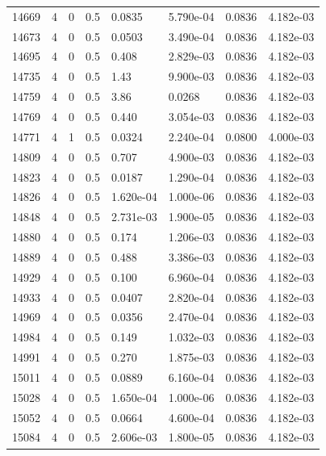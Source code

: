\documentclass[preview]{standalone}
\begin{document}
{{{{{{{{{{{{{{{{\begin{tabular}{L{1.2cm}C{1.2cm} C{0.3cm}C{0.5cm} C{1.4cm}C{1.4cm} C{1.4cm}C{1.4cm}}
  14669  &     4  & 0     & 0.5 &  0.0835  & 5.790e-04  & 0.0836 &  4.182e-03   \\ 
  14673  &     4  & 0     & 0.5 &  0.0503  & 3.490e-04  & 0.0836 &  4.182e-03   \\ 
  14695  &     4  & 0     & 0.5 &  0.408  & 2.829e-03  & 0.0836 &  4.182e-03   \\ 
  14735  &     4  & 0     & 0.5 &  1.43  & 9.900e-03  & 0.0836 &  4.182e-03   \\ 
  14759  &     4  & 0     & 0.5 &  3.86  & 0.0268  & 0.0836 &  4.182e-03   \\ 
  14769  &     4  & 0     & 0.5 &  0.440  & 3.054e-03  & 0.0836 &  4.182e-03   \\ 
  14771  &     4  & 1     & 0.5 &  0.0324  & 2.240e-04  & 0.0800 &  4.000e-03   \\ 
  14809  &     4  & 0     & 0.5 &  0.707  & 4.900e-03  & 0.0836 &  4.182e-03   \\ 
  14823  &     4  & 0     & 0.5 &  0.0187  & 1.290e-04  & 0.0836 &  4.182e-03   \\ 
  14826  &     4  & 0     & 0.5 &  1.620e-04  & 1.000e-06  & 0.0836 &  4.182e-03   \\ 
  14848  &     4  & 0     & 0.5 &  2.731e-03  & 1.900e-05  & 0.0836 &  4.182e-03   \\ 
  14880  &     4  & 0     & 0.5 &  0.174  & 1.206e-03  & 0.0836 &  4.182e-03   \\ 
  14889  &     4  & 0     & 0.5 &  0.488  & 3.386e-03  & 0.0836 &  4.182e-03   \\ 
  14929  &     4  & 0     & 0.5 &  0.100  & 6.960e-04  & 0.0836 &  4.182e-03   \\ 
  14933  &     4  & 0     & 0.5 &  0.0407  & 2.820e-04  & 0.0836 &  4.182e-03   \\ 
  14969  &     4  & 0     & 0.5 &  0.0356  & 2.470e-04  & 0.0836 &  4.182e-03   \\ 
  14984  &     4  & 0     & 0.5 &  0.149  & 1.032e-03  & 0.0836 &  4.182e-03   \\ 
  14991  &     4  & 0     & 0.5 &  0.270  & 1.875e-03  & 0.0836 &  4.182e-03   \\ 
  15011  &     4  & 0     & 0.5 &  0.0889  & 6.160e-04  & 0.0836 &  4.182e-03   \\ 
  15028  &     4  & 0     & 0.5 &  1.650e-04  & 1.000e-06  & 0.0836 &  4.182e-03   \\ 
  15052  &     4  & 0     & 0.5 &  0.0664  & 4.600e-04  & 0.0836 &  4.182e-03   \\ 
  15084  &     4  & 0     & 0.5 &  2.606e-03  & 1.800e-05  & 0.0836 &  4.182e-03   \\ 

\end{tabular}}}}}}}}}}}}}}}}}
\end{document}
